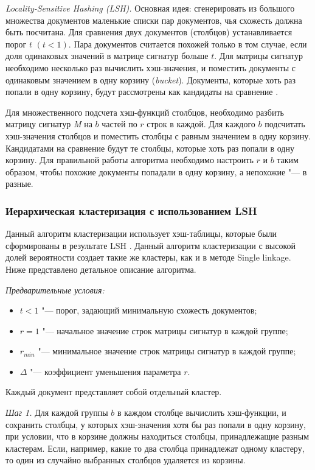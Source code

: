 \textit{Locality-Sensitive Hashing (LSH).} Основная идея: сгенерировать из большого множества документов маленькие списки пар документов, чья схожесть должна быть посчитана. Для сравнения двух документов (столбцов) устанавливается порог \(t\) \((t < 1)\). Пара документов считается похожей только в том случае, если доля одинаковых значений в матрице сигнатур больше \(t\). Для матрицы сигнатур необходимо несколько раз вычислить хэш-значения, и поместить документы с одинаковым значением в одну корзину (\textit{bucket}). Документы, которые хоть раз попали в одну корзину, будут рассмотрены как кандидаты на сравнение \cite{GionisIndykMotwani}.

Для множественного подсчета хэш-функций столбцов, необходимо разбить матрицу сигнатур \textit{M} на \(b\) частей по \(r\) строк в каждой. Для каждого \(b\) подсчитать хэш-значения столбцов и поместить столбцы с равным значением в одну корзину. Кандидатами на сравнение будут те столбцы, которые хоть раз попали в одну корзину. Для правильной работы алгоритма необходимо настроить \(r\) и \(b\) таким образом, чтобы похожие документы попадали в одну корзину, а непохожие "--- в разные.

\subsubsection{Иерархическая кластеризация с использованием LSH}

Данный алгоритм кластеризации использует хэш-таблицы, которые были сформированы в результате LSH \cite{KogaIshibashiWatanabe}. Данный алгоритм кластеризации с высокой долей вероятности создает такие же кластеры, как и в методе Single linkage. Ниже представлено детальное описание алгоритма.

\textit{Предварительные условия:}
\begin{itemize}
	\item \(t < 1\) "--- порог, задающий минимальную схожесть документов;
	\item \(r = 1\) "--- начальное значение строк матрицы сигнатур в каждой группе;
	\item \(r_\textit{min}\) "--- минимальное значение строк матрицы сигнатур в каждой группе;
	\item \(\Delta\) "--- коэффициент уменьшения параметра \(r\).
\end{itemize}

Каждый документ представляет собой отдельный кластер.

\textit{Шаг 1.} Для каждой группы \(b\) в каждом столбце вычислить хэш-функции, и сохранить столбцы, у которых хэш-значения хотя бы раз попали в одну корзину, при условии, что в корзине должны находиться столбцы, принадлежащие разным кластерам. Если, например, какие то два столбца принадлежат одному кластеру, то один из случайно выбранных столбцов удаляется из корзины.

